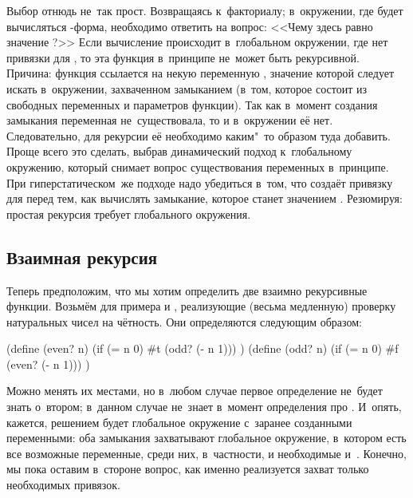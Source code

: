 Выбор отнюдь не~так прост. Возвращаясь к~факториалу; в~окружении, где будет
вычисляться -форма, необходимо ответить на вопрос: <<Чему здесь равно
значение ?>> Если вычисление происходит в~глобальном окружении, где нет
привязки для , то эта функция в~принципе не~может быть рекурсивной.
Причина: функция ссылается на некую переменную , значение которой
следует искать в~окружении, захваченном замыканием (в~том, которое состоит из
свободных переменных и параметров функции). Так как в~момент создания замыкания
переменная  не~существовала, то и в~окружении её нет. Следовательно,
для рекурсии её необходимо каким"~то образом туда добавить. Проще всего это
сделать, выбрав динамический подход к~глобальному окружению, который снимает
вопрос существования переменных в~принципе. При гиперстатическом~же подходе надо
убедиться в~том, что  создаёт привязку для  перед тем, как
вычислять замыкание, которое станет значением . Резюмируя: простая
рекурсия требует глобального окружения.


\subsection{Взаимная рекурсия}\label{lisp1-2-omega/recusion/ssect:mutual}

Теперь предположим, что мы хотим определить две взаимно рекурсивные функции.
Возьмём для примера  и , реализующие (весьма медленную)
проверку натуральных чисел на чётность. Они определяются следующим образом:

\begin{code:lisp}
(define (even? n)
  (if (= n 0) #t (odd? (- n 1))) )
(define (odd? n)
  (if (= n 0) #f (even? (- n 1))) )
\end{code:lisp}

Можно менять их местами, но в~любом случае первое определение не~будет знать
о~втором; в~данном случае  не~знает в~момент определения про
. И~опять, кажется, решением будет глобальное окружение с~заранее
созданными переменными: оба замыкания захватывают глобальное окружение,
в~котором есть все возможные переменные, среди них, в~частности, и необходимые
 и~. Конечно, мы пока оставим в~стороне вопрос, как именно
реализуется захват только необходимых привязок.

